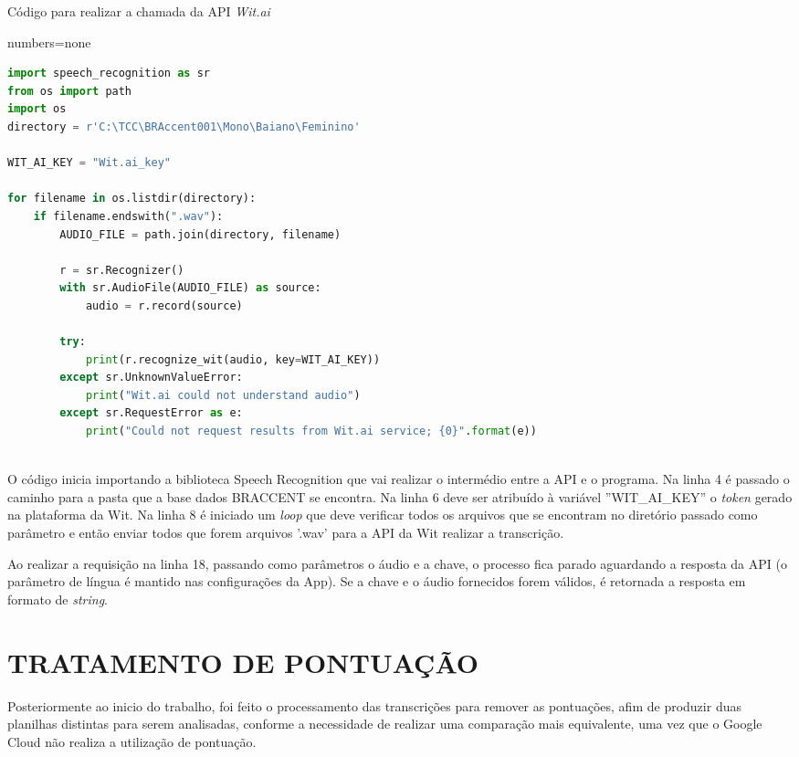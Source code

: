 \begin{quadro}[h]
\centering
\caption{Código para realizar a chamada da API \emph{Wit.ai}}
\label{witAPI}
{numbers=none}
\begin{lstlisting}[language=Python]
import speech_recognition as sr
from os import path
import os
directory = r'C:\TCC\BRAccent001\Mono\Baiano\Feminino'

WIT_AI_KEY = "Wit.ai_key" 

for filename in os.listdir(directory):
    if filename.endswith(".wav"):
        AUDIO_FILE = path.join(directory, filename)

        r = sr.Recognizer()
        with sr.AudioFile(AUDIO_FILE) as source:
            audio = r.record(source) 

        try:	
            print(r.recognize_wit(audio, key=WIT_AI_KEY))
        except sr.UnknownValueError:
            print("Wit.ai could not understand audio")
        except sr.RequestError as e:
            print("Could not request results from Wit.ai service; {0}".format(e))
            
\end{lstlisting}
\end{quadro}

O código inicia importando a biblioteca Speech Recognition que vai realizar o intermédio entre a API e o programa. Na linha 4 é passado o caminho para a pasta que a base dados BRACCENT se encontra. Na linha 6 deve ser atribuído à variável ''WIT\_AI\_KEY'' o \textit{token} gerado na plataforma da Wit. Na linha 8 é iniciado um \textit{loop} que deve verificar todos os arquivos que se encontram no diretório passado como parâmetro e então enviar todos que forem arquivos '.wav' para a API da Wit realizar a transcrição. 

 
Ao realizar a requisição na linha 18, passando como parâmetros o áudio e a chave, o processo fica parado aguardando a resposta da API (o parâmetro de língua é mantido nas configurações da App). Se a chave e o áudio fornecidos forem válidos, é retornada a resposta em formato de \textit{string}.

\section{TRATAMENTO DE PONTUAÇÃO}

Posteriormente ao inicio do trabalho, foi feito o processamento das transcrições para remover as pontuações, afim de produzir duas planilhas distintas para serem analisadas, conforme a necessidade de realizar uma comparação mais equivalente, uma vez que o Google Cloud não realiza a utilização de pontuação.

